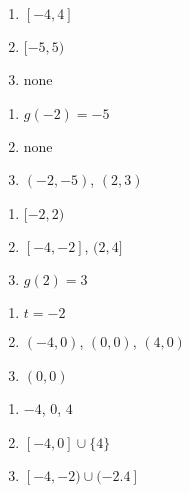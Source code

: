 \documentclass{ximera}
\begin{document}
\begin{multicols}{3}
\begin{enumerate}
\setcounter{enumi}{\value{HW}}

\item  $[-4,4]$ 
\item  $[-5,5)$
\item  none

\setcounter{HW}{\value{enumi}}
\end{enumerate}
\end{multicols}

\begin{multicols}{3}
\begin{enumerate}
\setcounter{enumi}{\value{HW}}

\item  $g(-2) = -5$
\item  none
\item  $(-2,-5)$, $(2,3)$

\setcounter{HW}{\value{enumi}}
\end{enumerate}
\end{multicols}

\begin{multicols}{3}
\begin{enumerate}
\setcounter{enumi}{\value{HW}}

\item  $[-2,2)$
\item  $[-4, -2]$, $(2,4]$
\item  $g(2) = 3$

\setcounter{HW}{\value{enumi}}
\end{enumerate}
\end{multicols}


\begin{multicols}{3}
\begin{enumerate}
\setcounter{enumi}{\value{HW}}

\item  $t=-2$
\item $(-4,0)$, $(0,0)$, $(4,0)$
\item  $(0,0)$

\setcounter{HW}{\value{enumi}}
\end{enumerate}
\end{multicols}

\begin{multicols}{3}
\begin{enumerate}
\setcounter{enumi}{\value{HW}}

\item  $-4$, $0$, $4$
\item  $[-4,0] \cup \{4\}$
\item $[-4,-2) \cup (-2.4]$

\setcounter{HW}{\value{enumi}}
\end{enumerate}
\end{multicols}
\end{document}
